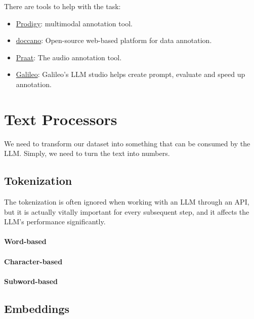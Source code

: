 There are tools to help with the task:
\begin{itemize}
	\item \href{https://prodi.gy/}{Prodigy}: multimodal annotation tool.
	\item \href{https://github.com/doccano/doccano}{doccano}: Open-source web-based platform for data annotation. 
	\item \href{https://www.fon.hum.uva.nl/praat/}{Praat}: The audio annotation tool.
	\item \href{https://galileo.ai/}{Galileo}: Galileo's LLM studio helps create prompt, evaluate and speed up annotation. 
\end{itemize}

\section{Text Processors}

We need to transform our dataset into something that can be consumed by the LLM. Simply, we need to turn the text into numbers.  

\subsection{Tokenization}
The tokenization is often ignored when working with an LLM through an API, but it is actually vitally important for every subsequent step, and it affects the LLM's performance significantly. 

\paragraph{Word-based}
\paragraph{Character-based}
\paragraph{Subword-based}

\subsection{Embeddings}






